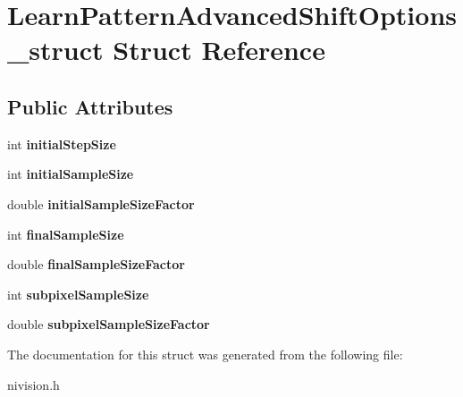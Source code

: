 \hypertarget{structLearnPatternAdvancedShiftOptions__struct}{\section{\-Learn\-Pattern\-Advanced\-Shift\-Options\-\_\-struct \-Struct \-Reference}
\label{structLearnPatternAdvancedShiftOptions__struct}
}
\subsection*{\-Public \-Attributes}
\begin{DoxyCompactItemize}
\item 
\hypertarget{structLearnPatternAdvancedShiftOptions__struct_a498a19cd7d8fee74c9b869cf71398c34}{int {\bfseries initial\-Step\-Size}}\label{structLearnPatternAdvancedShiftOptions__struct_a498a19cd7d8fee74c9b869cf71398c34}

\item 
\hypertarget{structLearnPatternAdvancedShiftOptions__struct_a9d9111d65d74f9ec99e949be3be130a7}{int {\bfseries initial\-Sample\-Size}}\label{structLearnPatternAdvancedShiftOptions__struct_a9d9111d65d74f9ec99e949be3be130a7}

\item 
\hypertarget{structLearnPatternAdvancedShiftOptions__struct_ac74501223629b9a7f514b7f229a14343}{double {\bfseries initial\-Sample\-Size\-Factor}}\label{structLearnPatternAdvancedShiftOptions__struct_ac74501223629b9a7f514b7f229a14343}

\item 
\hypertarget{structLearnPatternAdvancedShiftOptions__struct_a1f83aaaf9259b16f89ba7deafe09b48c}{int {\bfseries final\-Sample\-Size}}\label{structLearnPatternAdvancedShiftOptions__struct_a1f83aaaf9259b16f89ba7deafe09b48c}

\item 
\hypertarget{structLearnPatternAdvancedShiftOptions__struct_a98fd6a92dbd7354208b2c727c799ba4c}{double {\bfseries final\-Sample\-Size\-Factor}}\label{structLearnPatternAdvancedShiftOptions__struct_a98fd6a92dbd7354208b2c727c799ba4c}

\item 
\hypertarget{structLearnPatternAdvancedShiftOptions__struct_a8bc6ef603b6e71043a498d2fafdeaa77}{int {\bfseries subpixel\-Sample\-Size}}\label{structLearnPatternAdvancedShiftOptions__struct_a8bc6ef603b6e71043a498d2fafdeaa77}

\item 
\hypertarget{structLearnPatternAdvancedShiftOptions__struct_a0a660c7675d69391e741011af218b1b8}{double {\bfseries subpixel\-Sample\-Size\-Factor}}\label{structLearnPatternAdvancedShiftOptions__struct_a0a660c7675d69391e741011af218b1b8}

\end{DoxyCompactItemize}


\-The documentation for this struct was generated from the following file\-:\begin{DoxyCompactItemize}
\item 
nivision.\-h\end{DoxyCompactItemize}
